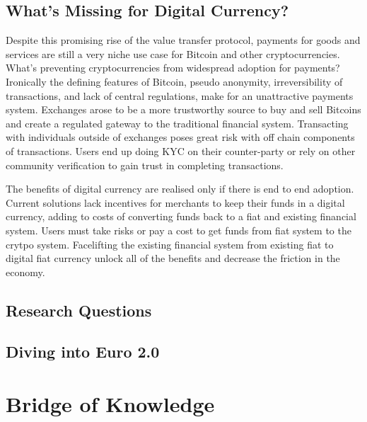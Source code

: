 \documentclass[12pt]{article} %
\begin{document}
\subsection{What's Missing for Digital Currency?}
Despite this promising rise of the value transfer protocol, payments for goods and services are still a very niche use case for Bitcoin and other cryptocurrencies. What's preventing cryptocurrencies from widespread adoption for payments? Ironically the defining features of Bitcoin, pseudo anonymity, irreversibility of transactions, and lack of central regulations, make for an unattractive payments system. Exchanges arose to be a more trustworthy source to buy and sell Bitcoins and create a regulated gateway to the traditional financial system. Transacting with individuals outside of exchanges poses great risk with off chain components of transactions. Users end up doing KYC on their counter-party or rely on other community verification to gain trust in completing transactions.

The benefits of digital currency are realised only if there is end to end adoption. Current solutions lack incentives for merchants to keep their funds in a digital currency, adding to costs of converting funds back to a fiat and existing financial system. Users must take risks or pay a cost to get funds from fiat system to the crytpo system. Facelifting the existing financial system from existing fiat to digital fiat currency unlock all of the benefits and decrease the friction in the economy. 

\subsection{Research Questions}

\subsection{Diving into Euro 2.0}

\pagebreak

\section{Bridge of Knowledge}
\label{Bridge of Knowledge}


\pagebreak
\end{document}
